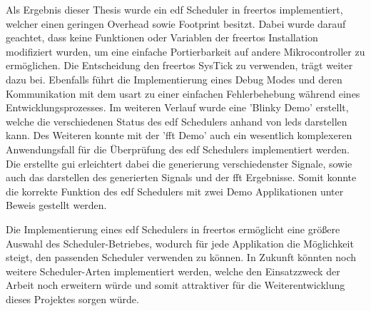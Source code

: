 \documentclass[../EDF Master Thesis.tex]{subfiles}
\begin{document}
    Als Ergebnis dieser Thesis wurde ein \ac{edf} Scheduler in \ac{freertos} implementiert, welcher einen geringen Overhead sowie Footprint besitzt.
    Dabei wurde darauf geachtet, dass keine Funktionen oder Variablen der \ac{freertos} Installation modifiziert wurden, um eine einfache Portierbarkeit auf andere Mikrocontroller zu ermöglichen.
    Die Entscheidung den \ac{freertos} SysTick zu verwenden, trägt weiter dazu bei.
    Ebenfalls führt die Implementierung eines Debug Modes und deren Kommunikation mit dem \ac{usart} zu einer einfachen Fehlerbehebung während eines Entwicklungsprozesses.
    Im weiteren Verlauf wurde eine 'Blinky Demo' erstellt, welche die verschiedenen Status des \ac{edf} Schedulers anhand von \ac{led}s darstellen kann.
    Des Weiteren konnte mit der '\ac{fft} Demo' auch ein wesentlich komplexeren Anwendungsfall für die Überprüfung des \ac{edf} Schedulers implementiert werden.
    Die erstellte \ac{gui} erleichtert dabei die generierung verschiedenster Signale, sowie auch das darstellen des generierten Signals und der \ac{fft} Ergebnisse.
    Somit konnte die korrekte Funktion des \ac{edf} Schedulers mit zwei Demo Applikationen unter Beweis gestellt werden.

    Die Implementierung eines \ac{edf} Schedulers in \ac{freertos} ermöglicht eine größere Auswahl des Scheduler-Betriebes, wodurch für jede Applikation die Möglichkeit steigt, den passenden Scheduler verwenden zu können.
    In Zukunft könnten noch weitere Scheduler-Arten implementiert werden, welche den Einsatzzweck der Arbeit noch erweitern würde und somit attraktiver für die Weiterentwicklung dieses Projektes sorgen würde. 
    
    
\end{document}
